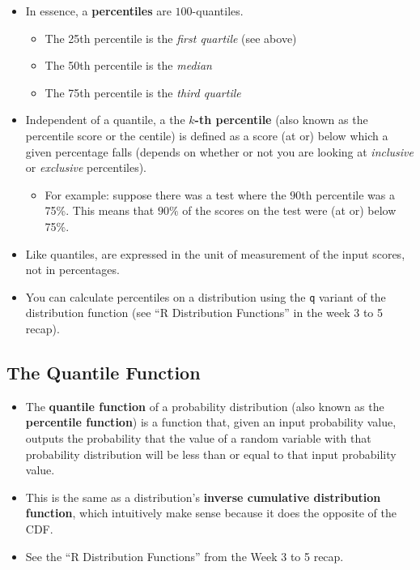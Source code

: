 \documentclass[12pt]{article}
\begin{document}
\begin{itemize}
	\item In essence, a \textbf{percentiles} are $100$-quantiles.
	      \begin{itemize}
		      \item The 25th percentile is the \emph{first quartile} (see above)
		      \item The 50th percentile is the \emph{median}
		      \item The 75th percentile is the \emph{third quartile}
	      \end{itemize}
	\item Independent of a quantile, a the \textbf{$k$-th percentile} (also
	      known as the percentile score or the centile) is defined as a score (at
	      or) below which a given percentage falls (depends on whether or not you
	      are looking at \emph{inclusive} or \emph{exclusive} percentiles).
	      \begin{itemize}
		      \item For example: suppose there was a test where the $90$th
		            percentile was a 75\%. This means that $90\%$ of the scores
		            on the test were (at or) below 75\%.
	      \end{itemize}
	\item Like quantiles, are expressed in the unit of measurement of the
	      input scores, not in percentages.
	\item You can calculate percentiles on a distribution using the
	      \verb|q| variant of the distribution function (see ``R
	      Distribution Functions'' in the week 3 to 5 recap).
\end{itemize}

\subsection*{The Quantile Function}

\begin{itemize}
	\item The \textbf{quantile function} of a probability distribution (also
	      known as the \textbf{percentile function}) is a function that, given
	      an input probability value, outputs the probability that the value of
	      a random variable with that probability distribution will be less than
	      or equal to that input probability value.
	\item This is the same as a distribution's \textbf{inverse cumulative
		      distribution function}, which intuitively make sense because
	      it does the opposite of the CDF.
	\item See the ``R Distribution Functions'' from the Week 3 to 5 recap.
\end{itemize}
\end{document}
